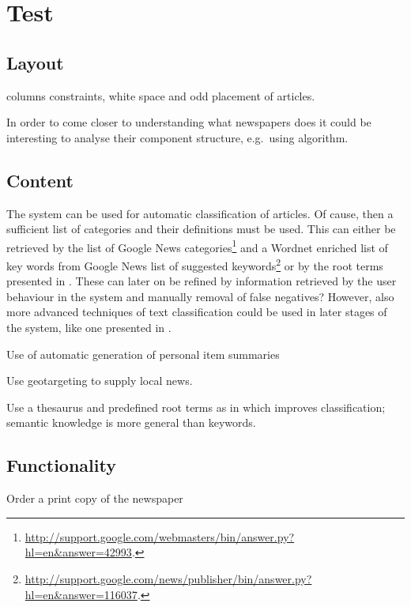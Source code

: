 \section{Test}

\subsection{Layout}

columns constraints, white space and odd placement of articles.

In order to come closer to understanding what newspapers does it could be interesting to analyse their component structure, e.g.\ using \cite{00953970.pdf} algorithm.


\subsection{Content}
The system can be used for automatic classification of articles. Of cause, then a sufficient list of categories and their definitions must be used. This can either be retrieved by the list of Google News categories\footnote{\url{http://support.google.com/webmasters/bin/answer.py?hl=en&answer=42993}.} and a Wordnet enriched list of key words from Google News list of suggested keywords\footnote{\url{http://support.google.com/news/publisher/bin/answer.py?hl=en&answer=116037}.} or by the root terms presented in \cite{10-1-1-19-5583}. These can later on be refined by information retrieved by the user behaviour in the system and manually removal of false negatives? However, also more advanced techniques of text classification could be used in later stages of the system, like one presented in \cite{Evaluating-a-User-Model-Based-Personalisation-Architecture-for-Digital-News-Services.pdf}.


Use of automatic generation of personal item summaries \cite{fulltext.pdf}


Use geotargeting to supply local news.

Use a thesaurus and predefined root terms as in \cite{10-1-1-19-5583} which improves classification; semantic knowledge is more general than keywords.

\subsection{Functionality}
Order a print copy of the newspaper



